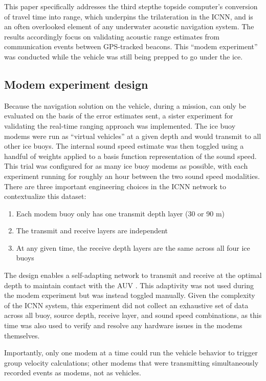 This paper specifically addresses the third step\textemdash the topside computer's conversion of travel time into range, which underpins the trilateration in the ICNN, and is an often overlooked element of any underwater acoustic navigation system.
The results accordingly focus on validating acoustic range estimates from communication events between GPS-tracked beacons.
This ``modem experiment'' was conducted while the vehicle was still being prepped to go under the ice.

\subsection{Modem experiment design}

Because the navigation solution on the vehicle, during a mission, can only be evaluated on the basis of the error estimates sent, a sister experiment for validating the real-time ranging approach was implemented.
The ice buoy modems were run as ``virtual vehicles'' at a given depth and would transmit to all other ice buoys.
The internal sound speed estimate was then toggled using a handful of weights applied to a basis function representation of the sound speed.
This trial was configured for as many ice buoy modems as possible, with each experiment running for roughly an hour between the two sound speed modalities.
There are three important engineering choices in the ICNN network to contextualize this dataset:
\begin{enumerate}
\item Each modem buoy only has one transmit depth layer (30 or 90 m)
\item The transmit and receive layers are independent
\item At any given time, the receive depth layers are the same across all four ice buoys
\end{enumerate}

The design enables a self-adapting network to transmit and receive at the optimal depth to maintain contact with the AUV \citep{schneider_self-adapting_2020}.
This adaptivity was not used during the modem experiment but was instead toggled manually.
Given the complexity of the ICNN system, this experiment did not collect an exhaustive set of data across all buoy, source depth, receive layer, and sound speed combinations, as this time was also used to verify and resolve any hardware issues in the modems themselves.

Importantly, only one modem at a time could run the vehicle behavior to trigger group velocity calculations; other modems that were transmitting simultaneously recorded events as modems, not as vehicles.

